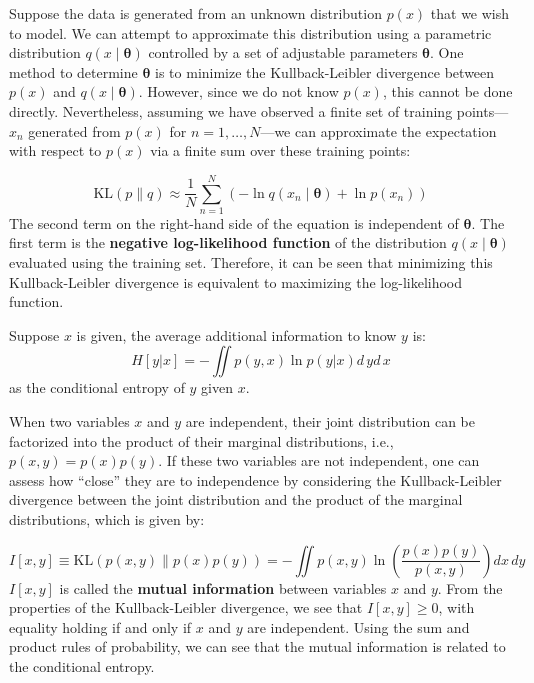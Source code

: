 \documentclass[../main.tex]{subfiles}
\begin{document}
Suppose the data is generated from an unknown distribution $p(x)$ that we wish to model. We can attempt to approximate this distribution using a parametric distribution $q(x \mid \boldsymbol{\theta})$ controlled by a set of adjustable parameters $\boldsymbol{\theta}$. One method to determine $\boldsymbol{\theta}$ is to minimize the Kullback-Leibler divergence between $p(x)$ and $q(x \mid \boldsymbol{\theta})$. However, since we do not know $p(x)$, this cannot be done directly. Nevertheless, assuming we have observed a finite set of training points---$x_n$ generated from $p(x)$ for $n=1, \ldots, N$---we can approximate the expectation with respect to $p(x)$ via a finite sum over these training points:

\begin{equation*}
\mathrm{KL}(p \| q) \approx \frac{1}{N} \sum_{n=1}^{N}\left(-\ln q\left(x_{n} \mid \boldsymbol{\theta}\right)+\ln p\left(x_{n}\right)\right)
\end{equation*}
The second term on the right-hand side of the equation is independent of $\boldsymbol{\theta}$. The first term is the \textbf{negative log-likelihood function} of the distribution $q(x \mid \boldsymbol{\theta})$ evaluated using the training set. Therefore, it can be seen that minimizing this Kullback-Leibler divergence is equivalent to maximizing the log-likelihood function.

\begin{purple}
\begin{definition}
    
Suppose $x$ is given, the average additional information to know $y$ is:
$$
H[y|x]=-\iint p(y,x)\ln p(y|x)d\,yd\,x
$$
as the conditional entropy of $y$ given $x$.
\end{definition}
\end{purple}

When two variables $x$ and $y$ are independent, their joint distribution can be factorized into the product of their marginal distributions, i.e., $p(x,y) = p(x)p(y)$. If these two variables are not independent, one can assess how ``close'' they are to independence by considering the Kullback-Leibler divergence between the joint distribution and the product of the marginal distributions, which is given by:

\begin{purple}
\begin{definition}



\begin{equation*}
I[x,y] \equiv \mathrm{KL}(p(x,y)\|p(x)p(y)) = -\iint p(x,y) \ln \left( \frac{p(x)p(y)}{p(x,y)} \right) dx\,dy
\end{equation*}
$I[x,y]$ is called the \textbf{mutual information} between variables $x$ and $y$. From the properties of the Kullback-Leibler divergence, we see that $I[x,y] \geq 0$, with equality holding if and only if $x$ and $y$ are independent. Using the sum and product rules of probability, we can see that the mutual information is related to the conditional entropy.

\end{definition}
\end{purple}
\end{document}
